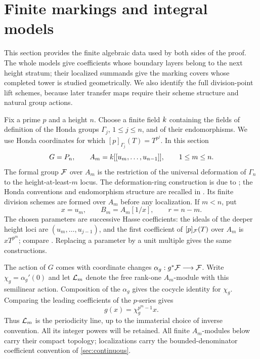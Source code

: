 \section{Finite markings and integral models}
\label{sec:finite-markings}

This section provides the finite algebraic data used by both sides of
the proof. The whole models give coefficients whose boundary layers
belong to the next height stratum; their localized summands give the
marking covers whose completed tower is studied geometrically. We also
identify the full division-point lift schemes, because later transfer
maps require their scheme structure and natural group actions.

Fix a prime $p$ and a height $n$.  Choose a finite field $k$ containing
the fields of definition of the Honda groups $\Gamma_j$, $1\leq j\leq n$,
and of their endomorphisms.  We use Honda coordinates for which
$[p]_{\Gamma_j}(T)=T^{p^j}$.  In this section
\[
 G=P_n,\qquad
 A_m=k[[u_m,\ldots,u_{n-1}]],\qquad 1\leq m\leq n.
\]
The formal group $\mathcal F$ over $A_m$ is the restriction of the universal
deformation of $\Gamma_n$ to the height-at-least-$m$ locus.
The deformation-ring construction is due to
\citet[Proposition~1.1 and Theorem~3.1]{lubinTate1966}; the Honda conventions and
endomorphism structure are recalled in \citet[Appendix~A2.2]{ravenel1986}.  Its finite
division schemes are formed over $A_m$ before any localization.  If
$m<n$, put
\[
 x=u_m,\qquad B_m=A_m[1/x],\qquad r=n-m.
\]
The chosen parameters are successive Hasse coefficients: the ideals of
the deeper height loci are $(u_m,\ldots,u_{j-1})$, and the first
coefficient of $[p]_{\mathcal F}(T)$ over $A_m$ is $xT^{p^m}$; compare
\citet[(1.1) and \S2]{strauch2007}.  Replacing a
parameter by a unit multiple gives the same constructions.

The action of $G$ comes with coordinate changes
$\alpha_g:g^*\mathcal F\longrightarrow\mathcal F$.  Write $\chi_g=\alpha_g'(0)$ and
let $\mathcal L_m$ denote the free rank-one $A_m$-module with this semilinear
action.  Composition of the $\alpha_g$ gives the cocycle identity for
$\chi_g$.  Comparing the leading coefficients of the $p$-series gives
\begin{equation}
 g(x)=\chi_g^{p^m-1}x.
 \label{eq:mark-height-character}
\end{equation}
Thus $\mathcal L_m$ is the periodicity line, up to the immaterial choice of
inverse convention.  All its integer powers will be retained.  All
finite $A_m$-modules below carry their compact topology; localizations
carry the bounded-denominator coefficient convention of
\cref{sec:continuous}.

